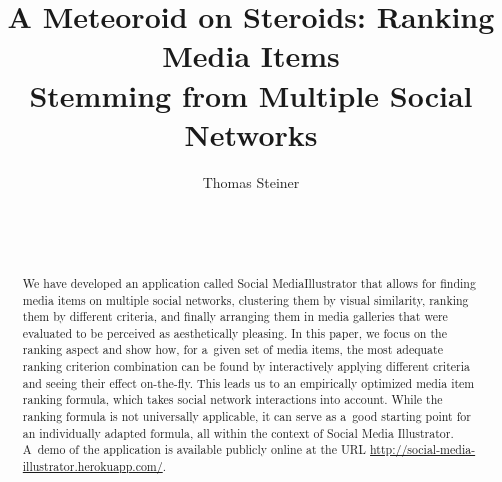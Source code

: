 \documentclass{sig-alternate}
\newcommand{\inlinelistingsize}{\fontsize{8pt}{11pt}}
\let\oldurl\url
\renewcommand{\url}[1]{\inlinelistingsize\oldurl{#1}}
\begin{document}


\title{A Meteoroid on Steroids: Ranking Media Items\\ Stemming from Multiple Social Networks}

\author{
\alignauthor
Thomas Steiner\\
	\\
	\\
	\\
}
\maketitle

\begin{abstract}
We have developed an application called Social Media\linebreak Illustrator
that allows for finding media items on multiple social networks,
clustering them by visual similarity, ranking them by different criteria,
and finally arranging them in media galleries
that were evaluated to be perceived as aesthetically pleasing.
In this paper, we focus on the ranking aspect and show how,
for a~given set of media items, the most adequate ranking criterion combination
can be found by interactively applying different criteria
and seeing their effect on-the-fly.
This leads us to an empirically optimized media item ranking formula,
which takes social network interactions into account.
While the ranking formula is not universally applicable,
it can serve as a~good starting point for an individually adapted formula,
all within the context of Social Media Illustrator.
A~demo of the application is available publicly online at the URL
\url{http://social-media-illustrator.herokuapp.com/}.
\end{abstract}

\vspace{-1mm}

\vspace{-2mm}

\vspace{-2mm}
\end{document}

